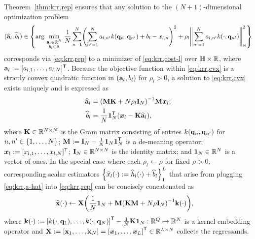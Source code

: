 Theorem~\ref{thm:krr,rep} ensures that any solution 
to the $(N+1)$-dimensional optimization problem 
\begin{align}
	(\est{\bma}_l,\est{b}_l) \in 
	\set{\argmin{\substack{\bma_l \in \reals{N} \\ b_l \in \real}} 
		\frac{1}{N} \sum_{n=1}^N \paren{\sum_{n'=1}^N a_{l,n'} k(\bmq_n,\bmq_{n'}) 
		+ b_l - x_{l,n}}^2 +
		\rho_l \norm{\sum_{n'=1}^N a_{l,n'} k(\cdot,\bmq_{n'})}^2_\hilb}
	\label{eq:krr,cvx}
\end{align}
corresponds via \eqref{eq:krr,rep} 
to a minimizer of \eqref{eq:krr,cost-l}
over $\mathbb{H} \times \mathbb{R}$,
where $\mathbf{a}_l := [a_{l,1},\dots,a_{l,N}]^{\mathsf{T}}$.
Because the objective function 
within \eqref{eq:krr,cvx}
is a strictly convex quadratic function
in $\paren{\bma_l,b_l}$
for $\rho_l > 0$,
a solution to \eqref{eq:krr,cvx} exists uniquely
and is expressed as
\begin{align}
	\est{\bma}_l &= \inv{\bmM \bmK + N\rho_l\eye{N}} \bmM \bmxg{l};
	\label{eq:krr,a-hat} \\
	\est{b}_l &= \frac{1}{N} \ones{N}\tpose \paren{\bmxg{l} - \bmK \est{\bma}_l},
	\label{eq:krr,b-hat}
\end{align}
where 
$\mathbf{K} \in \mathbb{R}^{N \times N}$ is the Gram matrix 
consisting of entries $k(\mathbf{q}_n,\mathbf{q}_{n'})$ for $n,n' \in \set{1,\dots,N}$;
$\mathbf{M} := \mathbf{I}_{N}-\frac{1}{N}\boldsymbol{1}_{N}\boldsymbol{1}_{N}^{\mathsf{T}}$ is a de-meaning operator;
$\boldsymbol{x}_{l} := [x_{l,1},\dots,x_{l,N}]^{\mathsf{T}}$;
$\mathbf{I}_{N} \in \mathbb{R}^{N \times N}$ is the identity matrix;
and $\boldsymbol{1}_{N} \in \mathbb{R}^{N}$ is a vector of ones.
In the special case where each
$\rho_l \gets \rho$ 
for fixed $\rho>0$, 
corresponding scalar estimators 
$\set{\est{x}_l\paren{\cdot} := \est{h}_l\paren{\cdot} + \est{b}_l}_1^L$
that arise from plugging \eqref{eq:krr,a-hat} into \eqref{eq:krr,rep}
can be concisely concatenated as
\begin{align}
	\bmxha{\cdot} &\gets \bmX 
		\paren{\frac{1}{N}\ones{N} + 
		\bmM\inv{\bmK\bmM + N\rho\eye{N}} \bmka{\cdot}},
		\label{eq:krr,x-hat}
\end{align}
where
$\bmka{\cdot} := \brac{k(\cdot,\bmq_1),\dots,k(\cdot,\bmq_N)}\tpose - \frac{1}{N}\bmK\ones{N}
: \reals{Q} \mapsto \reals{N}$
is a kernel embedding operator and 
$\bmX := \brac{\bmx_1,\dots,\bmx_N} = \brac{\bmxg{1},\dots,\bmxg{L}}\tpose 
\in \reals{L \times N}$
collects the regressands. 

